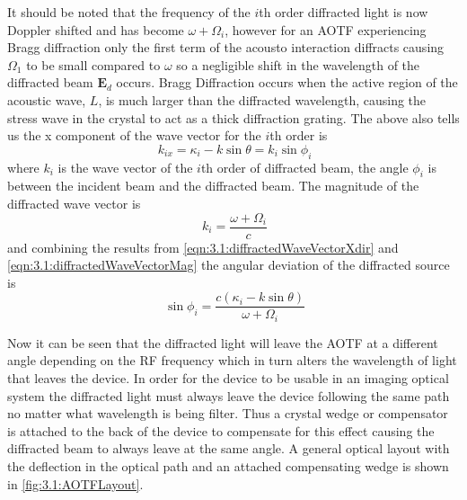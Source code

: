 It should be noted that the frequency of the $i$th order diffracted light is now Doppler shifted and has become $\omega+\Omega_{i}$, however for an AOTF experiencing Bragg diffraction only the first term of the acousto interaction diffracts causing $\Omega_{1}$ to be small compared to $\omega$ so a negligible shift in the wavelength of the diffracted beam $\mathbf{E}_{d}$ occurs. Bragg Diffraction occurs when the active region of the acoustic wave, $L$, is much larger than the diffracted wavelength, causing the stress wave in the crystal to act as a thick diffraction grating. The above also tells us the x component of the wave vector for the $i$th order is
\begin{equation}
    \ k_{ix} = \kappa_{i}-k\sin\theta = k_{i}\sin\phi_{i}
    \label{eqn:3.1:diffractedWaveVectorXdir}
\end{equation}
where $k_{i}$ is the wave vector of the $i$th order of diffracted beam, the angle $\phi_{i}$ is between the incident beam and the diffracted beam.  The magnitude of the diffracted wave vector is
\begin{equation}
    \ k_{i} = \frac{\omega+\Omega_{i}}{c}
    \label{eqn:3.1:diffractedWaveVectorMag}
\end{equation}
and combining the results from \autoref{eqn:3.1:diffractedWaveVectorXdir} and \autoref{eqn:3.1:diffractedWaveVectorMag} the angular deviation of the diffracted source is
\begin{equation}
    \ \sin\phi_{i} = \frac{c(\kappa_{i}-k\sin\theta)}{\omega+\Omega_{i}}
    \label{eqn:3.1:diffractedWaveVectroAngulareDeflection}
\end{equation}

Now it can be seen that the diffracted light will leave the AOTF at a different angle depending on the RF frequency which in turn alters the wavelength of light that leaves the device. In order for the device to be usable in an imaging optical system the diffracted light must always leave the device following the same path no matter what wavelength is being filter. Thus a crystal wedge or compensator is attached to the back of the device to compensate for this effect causing the diffracted beam to always leave at the same angle. A general optical layout with the deflection in the optical path and an attached compensating wedge is shown in \autoref{fig:3.1:AOTFLayout}.

